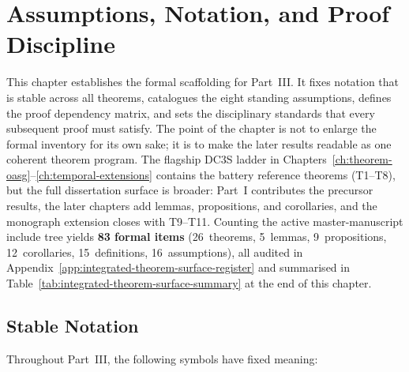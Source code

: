
\chapter{Assumptions, Notation, and Proof Discipline}
\label{ch:assumptions}

This chapter establishes the formal scaffolding for Part~III.  It fixes
notation that is stable across all theorems, catalogues the eight
standing assumptions, defines the proof dependency matrix, and sets the
disciplinary standards that every subsequent proof must satisfy.  The point of
the chapter is not to enlarge the formal inventory for its own sake; it is to
make the later results readable as one coherent theorem program.  The
flagship DC3S ladder in Chapters~\ref{ch:theorem-oasg}--\ref{ch:temporal-extensions}
contains the battery reference theorems (T1--T8), but the full dissertation
surface is broader: Part~I contributes the precursor results, the later
chapters add lemmas, propositions, and corollaries, and the monograph
extension closes with T9--T11.  Counting the active master-manuscript include
tree yields \textbf{83 formal items} (26~theorems, 5~lemmas,
9~propositions, 12~corollaries, 15~definitions, 16~assumptions), all audited in
Appendix~\ref{app:integrated-theorem-surface-register} and summarised in
Table~\ref{tab:integrated-theorem-surface-summary} at the end of this chapter.

\section{Stable Notation}

Throughout Part~III, the following symbols have fixed meaning:


